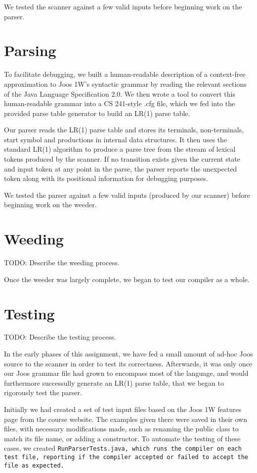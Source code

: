 \documentclass[12pt]{article}
\begin{document}
We tested the scanner against a few valid inputs before beginning work on the parser.

\section{Parsing}

To facilitate debugging, we built a human-readable description of a context-free approximation to Joos 1W's syntactic grammar by reading the relevant sections of the Java Language Specification 2.0.  We then wrote a tool to convert this human-readable grammar into a CS 241-style .cfg file, which we fed into the provided parse table generator to build an LR(1) parse table.

Our parser reads the LR(1) parse table and stores its terminals, non-terminals, start symbol and productions in internal data structures.  It then uses the standard LR(1) algorithm to produce a parse tree from the stream of lexical tokens produced by the scanner.  If no transition exists given the current state and input token at any point in the parse, the parser reports the unexpected token along with its positional information for debugging purposes.

We tested the parser against a few valid inputs (produced by our scanner) before beginning work on the weeder.

\section{Weeding}

TODO: Describe the weeding process.

Once the weeder was largely complete, we began to test our compiler as a whole.

\section{Testing}

TODO: Describe the testing process.

In the early phases of this assignment, we have fed a small amount of ad-hoc Joos source to the scanner in order to test its correctness. Afterwards, it was only once our Joos grammar file had grown to encompass most of the language, and would furthermore successully generate an LR(1) parse table, that we began to rigorously test the parser.

Initially we had created a set of test input files based on the Joos 1W features page from the course website. The examples given there were saved in their own files, with necessary modifications made, such as renaming the public class to match its file name, or adding a constructor. To automate the testing of these cases, we created \tt{RunParserTests.java}, which runs the compiler on each test file, reporting if the compiler accepted or failed to accept the file as expected. 
\end{document}
